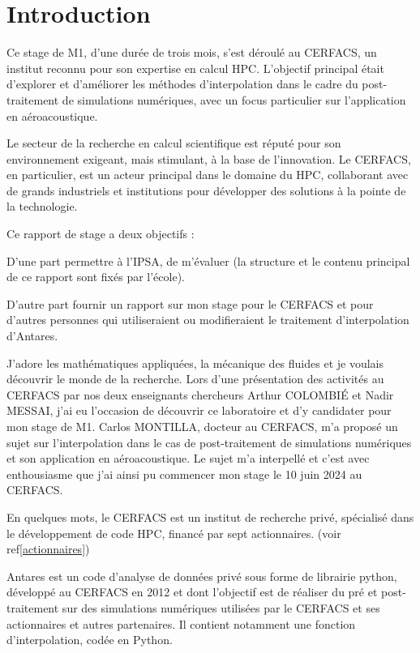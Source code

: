 \section*{Introduction}

Ce stage de M1, d'une durée de trois mois, s'est déroulé au CERFACS, un institut reconnu pour son expertise en calcul \ac{HPC}. L'objectif principal était d'explorer et d'améliorer les méthodes d'interpolation dans le cadre du post-traitement de simulations numériques, avec un focus particulier sur l'application en aéroacoustique.

Le secteur de la recherche en calcul scientifique est réputé pour son environnement exigeant, mais stimulant, à la base de l'innovation. Le CERFACS, en particulier, est un acteur principal dans le domaine du HPC, collaborant avec de grands industriels et institutions pour développer des solutions à la pointe de la technologie.

Ce rapport de stage a deux objectifs :

D'une part permettre à l'IPSA, de m'évaluer (la structure et le contenu principal de ce rapport sont fixés par l'école).

D'autre part fournir un rapport sur mon stage pour le CERFACS et pour d'autres personnes qui utiliseraient ou modifieraient le traitement d'interpolation d'Antares.

\vspace{0.5cm}

J'adore les mathématiques appliquées, la mécanique des fluides et je voulais découvrir le monde de la recherche. Lors d'une présentation des activités au \ac{CERFACS} par nos deux enseignants chercheurs Arthur COLOMBIÉ et Nadir MESSAI, j'ai eu l'occasion de découvrir ce laboratoire et d'y candidater pour mon stage de M1. Carlos MONTILLA, docteur au CERFACS, m'a proposé un sujet sur l'interpolation dans le cas de post-traitement de simulations numériques et son application en aéroacoustique. Le sujet m'a interpellé et c'est avec enthousiasme que j'ai ainsi pu commencer mon stage le 10 juin 2024 au CERFACS.

En quelques mots, le CERFACS est un institut de recherche privé, spécialisé dans le développement de code HPC, financé par sept actionnaires. (voir ref\ref{actionnaires})

Antares\cite{antares} est un code d’analyse de données privé sous forme de librairie python, développé au CERFACS en 2012 et dont l'objectif est de réaliser du pré et post-traitement sur des simulations numériques utilisées par le CERFACS et ses actionnaires et autres partenaires.
Il contient notamment une fonction d'interpolation, codée en Python.

